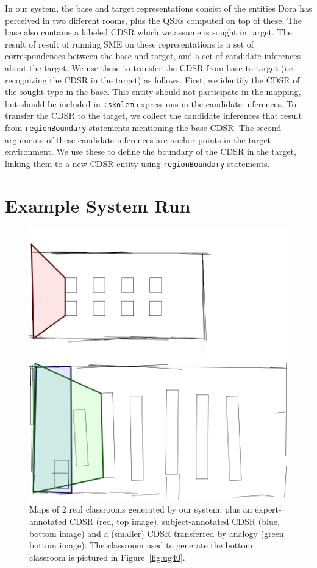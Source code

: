 \documentclass[letterpaper]{article}
\newcommand{\fw}[1]{\texttt{#1}}
\begin{document}
In our system, the base and target representations consist of the entities Dora has perceived in two different rooms, plus the QSRs computed on top of these. The base also contains a labeled CDSR which we assume is sought in target. The result of result of running SME on these representations is a set of correspondences between the base and target, and a set of candidate inferences about the target. We use these to transfer the CDSR from base to target (i.e. recognizing the CDSR in the target) as follows. First, we identify the CDSR of the sought type in the base. This entity should not participate in the mapping, but should be included in \fw{:skolem} expressions in the candidate inferences. To transfer the CDSR to the target, we collect the candidate inferences that result from \fw{regionBoundary} statements mentioning the base CDSR. The second arguments of these candidate inferences are anchor points in the target environment. We use these to define the boundary of the CDSR in the target, linking them to a new CDSR entity using \fw{regionBoundary} statements. 

\section{Example System Run}\label{sec:example}



\begin{figure}
 \includegraphics[width=\columnwidth]{images/worked-example.png}
  \caption{Maps of 2 real classrooms generated by our system, plus an expert-annotated CDSR (red, top image), subject-annotated CDSR (blue, bottom image) and a (smaller) CDSR transferred by analogy (green bottom image). The classroom used to generate the bottom classroom is pictured in Figure~\ref{fig:ug40}.}
  \label{fig:rooms}
\end{figure}
\end{document}
